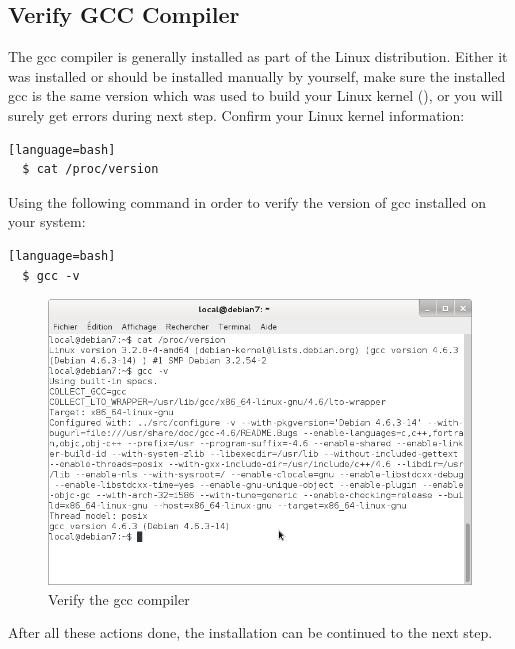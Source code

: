 
\subsection{Verify GCC Compiler}
The gcc compiler is generally installed as part of the Linux distribution. Either it was installed or should be installed manually by yourself, make sure the installed gcc is the same version which was used to build your Linux kernel (), or you will surely get errors during next step. Confirm your Linux kernel information:
\begin{lstlisting}[style=DOS][language=bash]
  $ cat /proc/version
\end{lstlisting}
Using the following command in order to verify the version of gcc installed on your system:
\begin{lstlisting}[style=DOS][language=bash]
  $ gcc -v
\end{lstlisting}

\begin{figure}[htbp]
	\centering
		\includegraphics[width=13cm]{Figures/gcc.png}
	\caption{Verify the gcc compiler}
	\label{fig:gcc}
\end{figure}
After all these actions done, the installation can be continued to the next step.


